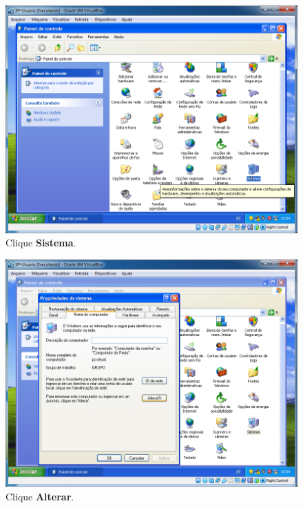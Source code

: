 \documentclass[10pt]{article}
\begin{document}
\begin{figure}[H]
    \centering
    \caption{Clique \textbf{Sistema}.}
    \label{fig:4121}
    \includegraphics[width=\linewidth]{images/xp_rede/004.png}
\end{figure}

\begin{figure}[H]
    \centering
    \caption{Clique \textbf{Alterar}.}
    \label{fig:4122}
    \includegraphics[width=\linewidth]{images/xp_rede/006.png}
\end{figure}
\end{document}
